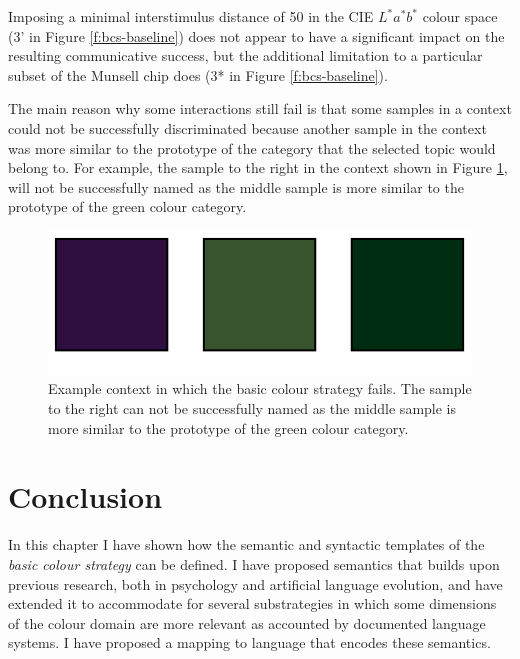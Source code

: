 Imposing a minimal interstimulus distance of 50 in the CIE $L^*a^*b^*$
colour space (3' in Figure \ref{f:bcs-baseline}) does not
appear to have a significant impact on the resulting communicative
success, but the additional limitation to a particular subset of the
Munsell chip does (3* in Figure \ref{f:bcs-baseline}).

The main reason why some interactions still fail is that some samples
in a context could not be successfully discriminated because another
sample in the context was more similar to the prototype of the
category that the selected topic would belong to. For example, the
sample to the right in the context shown in Figure
\ref{f:bcs-failure-context}, will not be successfully named as
the middle sample is more similar to the prototype of the green colour
category.

\begin{figure}[htbp]
  \begin{center}
    \includegraphics{./basic-strategy/figures/baseline-failure-context.pdf}
    \caption[Example context in which the basic colour strategy
    fails]{Example context in which the basic colour strategy
      fails. The sample to the right can not be successfully named as
      the middle sample is more similar to the prototype of the green
      colour category.}
    \label{f:bcs-failure-context}
  \end{center}
\end{figure}

\section{Conclusion}

In this chapter I have shown how the semantic and syntactic templates
of the \emph{basic colour strategy} can be defined. I have proposed
semantics that builds upon previous research, both in psychology and
artificial language evolution, and have extended it to accommodate for
several substrategies in which some dimensions of the colour domain
are more relevant as accounted by documented language systems. I have
proposed a mapping to language that encodes these semantics.

